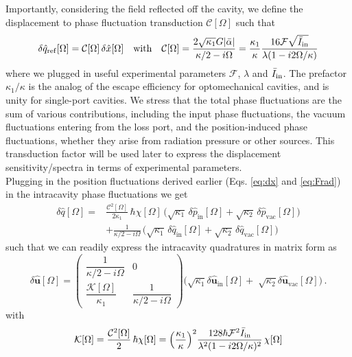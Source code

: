Importantly, considering the field reflected off the cavity, we define the displacement to phase fluctuation transduction $\mathcal{C}[\Omega]$ such that 
\begin{equation}
  \delta \hat{q}_{\mathrm{ref}}[\Omega] = \mathcal{C}[\Omega] \, \delta \hat{x}[\Omega] \quad \text{with} \quad \mathcal{C}[\Omega] = \frac{2\sqrt{\kappa_1}G|\bar \alpha|}{\kappa/2 - i\Omega} = \frac{\kappa_1}{\kappa} \dfrac{16 \mathcal{F}\sqrt{\bar{I}_{\rm in}}}{\lambda (1- i2\Omega/\kappa)}
\end{equation}
where we plugged in useful experimental parameters $\mathcal{F}$, $\lambda$ and $\bar I_{\rm in}$. The prefactor $\kappa_1/\kappa$ is the analog of the escape efficiency for optomechanical cavities, and is unity for single-port cavities. We stress that the total phase fluctuations are the sum of various contributions, including the input phase fluctuations, the vacuum fluctuations entering from the loss port, and the position-induced phase fluctuations, whether they arise from radiation pressure or other sources. This transduction factor will be used later to express the displacement sensitivity/spectra in terms of experimental parameters. \\


Plugging in the position fluctuations derived earlier (Eqs. \eqref{eq:dx} and \eqref{eq:Frad}) in the intracavity phase fluctuations we get
\begin{equation}
  \begin{split}
\delta \hat{q}[\Omega] =  &\frac{ \mathcal{C}^2[\Omega]}{2\kappa_1}  \,\hbar  \chi[\Omega] \, \bigg( \sqrt{\kappa_1} \, \delta \hat{p}_{\mathrm{in}}[\Omega] + \sqrt{\kappa_2} \, \delta \hat{p}_{\mathrm{vac}}[\Omega] \bigg) \\ 
 & +\frac{1}{\kappa/2 - i\Omega} \, \bigg( \sqrt{\kappa_1} \, \delta \hat{q}_{\mathrm{in}}[\Omega] + \sqrt{\kappa_2} \, \delta \hat{q}_{\mathrm{vac}}[\Omega] \bigg) 
  \end{split}
\end{equation}
such that we can readily express the intracavity quadratures in matrix form as
\begin{equation}
\delta\mathbf{\hat{\mathbf u}} [\Omega]
=
\left(
\begin{array}{cc}
\dfrac{1}{\kappa/2 - i\Omega} & 0\\[6pt]
\dfrac{\mathcal{K}[\Omega]}{\kappa_1} & \dfrac{1}{\kappa/2 - i\Omega}
\end{array}
\right)
\bigg( 
\sqrt{\kappa_1} \delta\mathbf{\hat{\mathbf u}} _{\mathrm{in}}[\Omega] +\;
\sqrt{\kappa_2} \delta\mathbf{\hat{\mathbf u}} _{\mathrm{vac}}[\Omega] \bigg)  \, .
\end{equation}
with
\begin{equation}
  \mathcal{K}[\Omega] = \frac{ \mathcal{C}^2[\Omega]}{2}  \,\hbar  \chi[\Omega]= \Bigl(\dfrac{\kappa_{\mathrm{1}}}{\kappa}\Bigr)^2 \dfrac{128 \hbar \mathcal{F}^2 \bar I_{\rm in}}{\lambda^2(1 - i2\Omega/\kappa)^2}  \,  \chi[\Omega]
\label{eq:K}
\end{equation}

